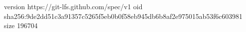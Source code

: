 version https://git-lfs.github.com/spec/v1
oid sha256:9de2dd51c3a91357c5265f5eb0b0f58eb945db6b8af2e975015ab53f6c603981
size 196704
